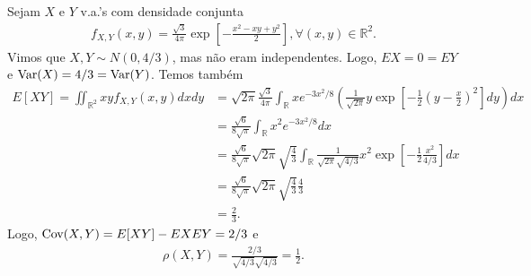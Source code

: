 \documentclass[../Notas.tex]{subfiles}
\begin{document}
\begin{example}
Sejam $X$ e $Y$ v.a.'s com densidade conjunta
\begin{align*}
    f_{X,Y}(x,y) = \frac{\sqrt{3}}{4\pi}\exp[ -\frac{x^2 - xy + y^2}{2} ], \forall (x,y)\in\mathbb{R}^2.
\end{align*}
Vimos que $X,Y\sim N(0, 4/3)$, mas não eram independentes. Logo, $EX = 0 = EY$ e $\text{Var}(X) = 4/3 = \text{Var}(Y)$. Temos também
\begin{align*}
    E[XY] = \iint_{\mathbb{R}^2} xyf_{X,Y}(x,y) dxdy &= \sqrt{2\pi}\frac{\sqrt{3}}{4\pi}\int_{\mathbb{R}} xe^{-3x^2/8}\left( \frac{1}{\sqrt{2\pi}} y\exp[ -\frac{1}{2}\left( y - \frac{x}{2} \right)^2 ] dy\right) dx \\
    &= \frac{\sqrt{6}}{8\sqrt{\pi}} \int_{\mathbb{R}} x^2e^{-3x^2/8} dx \\
    &= \frac{\sqrt{6}}{8\sqrt{\pi}}\sqrt{2\pi}\sqrt{\frac{4}{3}}\int_{\mathbb{R}} \frac{1}{\sqrt{2\pi}\sqrt{4/3}} x^2 \exp[ -\frac{1}{2}\frac{x^2}{4/3} ] dx \\
    &= \frac{\sqrt{6}}{8\sqrt{\pi}}\sqrt{2\pi}\sqrt{\frac{4}{3}}\frac{4}{3} \\
    &= \frac{2}{3}.
\end{align*}
Logo, $\text{Cov}(X,Y) = E[XY] - EXEY = 2/3$ e 
\begin{align*}
    \rho(X,Y) = \frac{2/3}{\sqrt{4/3}\sqrt{4/3}} = \frac{1}{2}.
\end{align*}
\end{example}
\end{document}
